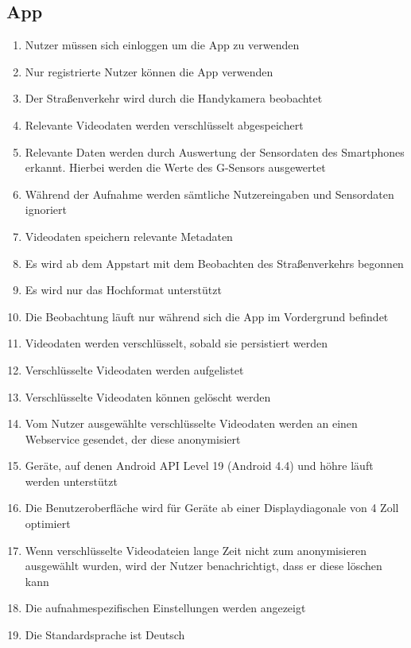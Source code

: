 \subsection{App}
	\begin{enumerate}
	\renewcommand{\labelenumi}{\textbf{\theenumi}}
	\renewcommand{\theenumi}{PK\arabic{enumi}0}
	\setcounter{enumi}{99}
	\item Nutzer müssen sich einloggen um die App zu verwenden
	\item Nur registrierte Nutzer können die App verwenden
	\item Der Straßenverkehr wird durch die Handykamera beobachtet 
	\item Relevante Videodaten werden verschlüsselt abgespeichert
	\item Relevante Daten werden durch Auswertung der Sensordaten des Smartphones erkannt. Hierbei werden die Werte des G-Sensors ausgewertet
	\item Während der Aufnahme werden sämtliche Nutzereingaben und Sensordaten ignoriert
	\item Videodaten speichern relevante Metadaten
	\item Es wird ab dem Appstart mit dem Beobachten des Straßenverkehrs begonnen
	\item Es wird nur das Hochformat unterstützt
	\item Die Beobachtung läuft nur während sich die App im Vordergrund befindet
	\item Videodaten werden verschlüsselt, sobald sie persistiert werden
	\item Verschlüsselte Videodaten werden aufgelistet
	\item Verschlüsselte Videodaten können gelöscht werden
	\item Vom Nutzer ausgewählte verschlüsselte Videodaten werden an einen Webservice gesendet, der diese anonymisiert
	\item Geräte, auf denen Android API Level 19 (Android 4.4) und höhre läuft werden unterstützt
	\item Die Benutzeroberfläche wird für Geräte ab einer Displaydiagonale von 4 Zoll optimiert
	\item Wenn verschlüsselte Videodateien lange Zeit nicht zum anonymisieren ausgewählt wurden, wird der Nutzer benachrichtigt, dass er diese löschen kann
	\item Die aufnahmespezifischen Einstellungen werden angezeigt
	\item Die Standardsprache ist Deutsch
	\end{enumerate}
